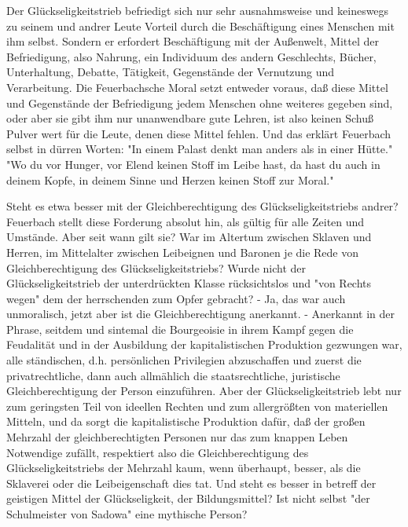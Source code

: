 Der Glückseligkeitstrieb befriedigt sich nur sehr ausnahmsweise
und keineswegs zu seinem und andrer Leute Vorteil durch die
Beschäftigung eines Menschen mit ihm selbst. Sondern er erfordert
Beschäftigung mit der Außenwelt, Mittel der Befriedigung, also Nahrung,
ein Individuum des andern Geschlechts, Bücher, Unterhaltung, Debatte,
Tätigkeit, Gegenstände der Vernutzung und Verarbeitung. Die
Feuerbachsche Moral setzt entweder voraus, daß diese Mittel und
Gegenstände der Befriedigung jedem Menschen ohne weiteres gegeben sind,
oder aber sie gibt ihm nur unanwendbare gute Lehren, ist also keinen
Schuß Pulver wert für die Leute, denen diese Mittel fehlen. Und das
erklärt Feuerbach selbst in dürren Worten: "In einem Palast denkt man
anders als in einer Hütte." "Wo du vor Hunger, vor Elend keinen Stoff im
Leibe hast, da hast du auch in deinem Kopfe, in deinem Sinne und Herzen
keinen Stoff zur Moral."

Steht es etwa besser mit der Gleichberechtigung des
Glückseligkeitstriebs andrer? Feuerbach stellt diese Forderung absolut
hin, als gültig für alle Zeiten und Umstände. Aber seit wann gilt sie?
War im Altertum zwischen Sklaven und Herren, im Mittelalter zwischen
Leibeignen und Baronen je die Rede von Gleichberechtigung des
Glückseligkeitstriebs? Wurde nicht der Glückseligkeitstrieb der
unterdrückten Klasse rücksichtslos und "von Rechts wegen" dem der
herrschenden zum Opfer gebracht? - Ja, das war auch unmoralisch, jetzt
aber ist die Gleichberechtigung anerkannt. - Anerkannt in der Phrase,
seitdem und sintemal die Bourgeoisie in ihrem Kampf gegen die Feudalität
und in der Ausbildung der kapitalistischen Produktion gezwungen war,
alle ständischen, d.h. persönlichen Privilegien abzuschaffen und zuerst
die privatrechtliche, dann auch allmählich die staatsrechtliche,
juristische Gleichberechtigung der Person einzuführen. Aber der
Glückseligkeitstrieb lebt nur zum geringsten Teil von ideellen Rechten
und zum allergrößten von materiellen Mitteln, und da sorgt die
kapitalistische Produktion dafür, daß der großen Mehrzahl der
gleichberechtigten Personen nur das zum knappen Leben Notwendige
zufällt, respektiert also die Gleichberechtigung des
Glückseligkeitstriebs der Mehrzahl kaum, wenn überhaupt, besser, als die
Sklaverei oder die Leibeigenschaft dies tat. Und steht es besser in
betreff der geistigen Mittel der Glückseligkeit, der Bildungsmittel? Ist
nicht selbst "der Schulmeister von Sadowa" eine mythische Person?

